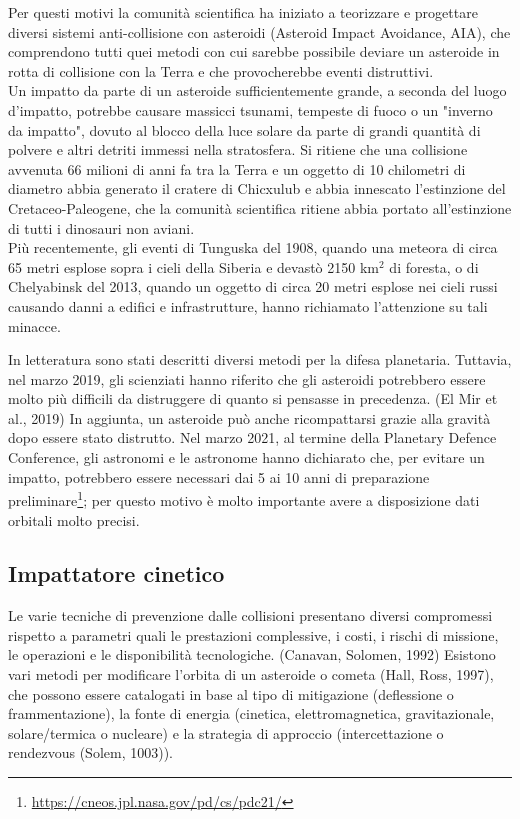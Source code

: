 \documentclass[a4paper,11pt,openright]{book}
\begin{document}
Per questi motivi la comunità scientifica ha iniziato a teorizzare e progettare diversi sistemi anti-collisione con asteroidi (Asteroid Impact Avoidance, AIA), che comprendono tutti quei metodi con cui sarebbe possibile deviare un asteroide in rotta di collisione con la Terra e che provocherebbe eventi distruttivi.\\
Un impatto da parte di un asteroide sufficientemente grande, a seconda del luogo d'impatto, potrebbe causare massicci tsunami, tempeste di fuoco o un "inverno da impatto", dovuto al blocco della luce solare da parte di grandi quantità di polvere e altri detriti immessi nella stratosfera. Si ritiene che una collisione avvenuta 66 milioni di anni fa tra la Terra e un oggetto di 10 chilometri di diametro abbia generato il cratere di Chicxulub e abbia innescato l'estinzione del Cretaceo-Paleogene, che la comunità scientifica ritiene abbia portato all'estinzione di tutti i dinosauri non aviani.\\
Più recentemente, gli eventi di Tunguska del 1908, quando una meteora di circa 65 metri esplose sopra i cieli della Siberia e devastò 2150 km$^2$ di foresta, o di Chelyabinsk del 2013, quando un oggetto di circa 20 metri esplose nei cieli russi causando danni a edifici e infrastrutture, hanno richiamato l'attenzione su tali minacce.

In letteratura sono stati descritti diversi metodi per la difesa planetaria. Tuttavia, nel marzo 2019, gli scienziati hanno riferito che gli asteroidi potrebbero essere molto più difficili da distruggere di quanto si pensasse in precedenza. (El Mir et al., 2019) In aggiunta, un asteroide può anche ricompattarsi grazie alla gravità dopo essere stato distrutto. Nel marzo 2021, al termine della Planetary Defence Conference, gli astronomi e le astronome hanno dichiarato che, per evitare un impatto, potrebbero essere necessari dai 5 ai 10 anni di preparazione preliminare\footnote{\href{https://cneos.jpl.nasa.gov/pd/cs/pdc21/}{https://cneos.jpl.nasa.gov/pd/cs/pdc21/}}; per questo motivo è molto importante avere a disposizione dati orbitali molto precisi.

\subsection{Impattatore cinetico}
Le varie tecniche di prevenzione dalle collisioni presentano diversi compromessi rispetto a parametri quali le prestazioni complessive, i costi, i rischi di missione, le operazioni e le disponibilità tecnologiche. (Canavan, Solomen, 1992) Esistono vari metodi per modificare l'orbita di un asteroide o cometa (Hall, Ross, 1997), che possono essere catalogati in base al tipo di mitigazione (deflessione o frammentazione), la fonte di energia (cinetica, elettromagnetica, gravitazionale, solare/termica o nucleare) e la strategia di approccio (intercettazione o rendezvous (Solem, 1003)).
\end{document}
